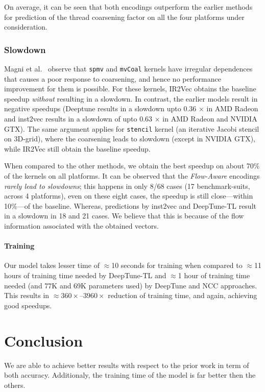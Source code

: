 On average, it can be seen that both encodings outperform the earlier methods for prediction of the thread coarsening factor on all the four platforms under consideration. 

\subsubsection{Slowdown}  Magni et al.~\cite{magni2014automatic} observe that \texttt{spmv} and \texttt{mvCoal} kernels have irregular dependences that causes a poor response to coarsening, and hence no performance improvement for them is possible.
For these kernels, IR2Vec obtains the baseline speedup \textit{without} resulting in a slowdown. In contrast, the earlier models result in negative speedups (Deeptune results in a slowdown upto $0.36$ $\times$ in AMD Radeon and inst2vec results in a slowdown of upto $0.63$ $\times$ in AMD Radeon and NVIDIA GTX). 
The same argument applies for \texttt{stencil} kernel (an iterative Jacobi stencil on 3D-grid), where the coarsening leads to slowdown (except in NVIDIA GTX), while IR2Vec still obtain the baseline speedup.

When compared to the other methods, we obtain the best speedup on about 70\% of the kernels on all platforms. 
It can be observed that the \textit{Flow-Aware} encodings \textit{rarely lead to slowdowns}; this happens in only 8/68 cases (17 benchmark-suits, across 4 platforms), even on these eight cases, the speedup is still close---within 10\%---of the baseline. 
Whereas, predictions by inst2vec and DeepTune-TL result in a slowdown in 18 and 21 cases.
We believe that this is because of the flow information associated with the obtained vectors.

\paragraph{Training}
Our model takes lesser time of $\approx$10 seconds for training when compared to $\approx$11 hours of training time needed by DeepTune-TL and $\approx$1 hour of training time needed (and 77K and 69K parameters used) by DeepTune and NCC approaches. 
This results in $\approx 360\times$--$3960\times$ reduction of training time, and again, achieving good speedups. 


\section{Conclusion}\label{sec:tc:conclusion}
We are able to achieve better results with respect to the prior work in term of both accuracy. Additionaly, the training time of the model is far better then the others.